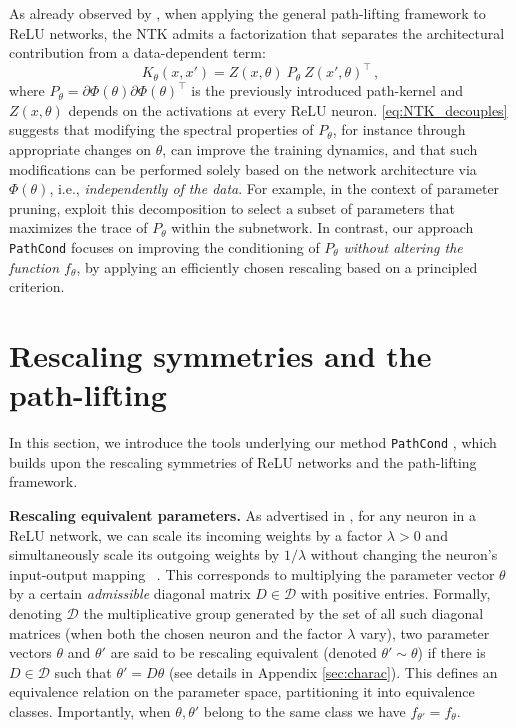 \documentclass{article}
\theoremstyle{plain}
\theoremstyle{definition}
\theoremstyle{remark}
\def\Dcal{\mathcal{D}}
\def\pathcond{{\texttt{PathCond} }}
\def\Dcal{{\mathcal{D}}}
\begin{document}
As already observed by \citet{gebhart2021unified,patil2021phew}, when applying the general path-lifting framework to ReLU networks,
the NTK admits a factorization that separates the architectural contribution from a data-dependent 
term:
\begin{equation}
\label{eq:NTK_decouples}
K_{\theta}(x, x') = Z(x,\theta) \ P_\theta \ Z(x',\theta)^\top\,,
\end{equation}
where $P_\theta = \partial \Phi(\theta)  \partial \Phi(\theta)^\top$ is the previously introduced path-kernel 
and $Z(x,\theta)$ depends on the activations at every ReLU neuron.
\cref{eq:NTK_decouples} suggests that modifying the spectral properties of $P_\theta$, 
for instance through appropriate changes on $\theta$, can improve the training dynamics, 
and that such modifications can be performed solely based on the network architecture via $\Phi(\theta)$, 
i.e., \emph{independently of the data}.
For example, in the context of parameter pruning, \citet{patil2021phew} exploit this decomposition to select a subset of parameters 
that maximizes the trace of $P_\theta$ within the subnetwork.
In contrast, our approach \pathcond focuses on improving the conditioning of $P_\theta$ 
\emph{without altering the function $f_{\theta}$}, by applying an efficiently chosen rescaling based on a principled criterion.



\section{Rescaling symmetries and the path-lifting \label{sec:pathlifiting_section}} 

In this section, we introduce the tools underlying our method \pathcond, 
which builds upon the rescaling symmetries of ReLU networks and the path-lifting framework.

\textbf{Rescaling equivalent parameters.}
As advertised in , for any neuron in a ReLU network,
we can scale its incoming weights by a factor $\lambda > 0$ and simultaneously scale its outgoing weights 
by $1/\lambda$ without changing the neuron's input-output mapping ~\citep{neyshabur2015path,dinh2017sharp}. This corresponds to multiplying the parameter vector $\theta$ by a certain \emph{admissible} diagonal matrix 
$D \in \Dcal$ with positive entries. 
Formally, denoting $\Dcal$ the multiplicative group generated 
by the set of all such diagonal matrices
(when both the chosen neuron and the factor $\lambda$ vary), 
two parameter vectors $\theta$ and $\theta'$ are said to be rescaling equivalent (denoted $\theta' \sim \theta$) if there is $D \in \Dcal$ 
such that $\theta' = D\theta$ (see details in Appendix \ref{sec:charac}). This defines an equivalence relation on the parameter space, partitioning it into equivalence classes. 
Importantly, when $\theta,\theta'$ belong to the same class we have  $f_{\theta'}=f_{\theta}$.
\end{document}
